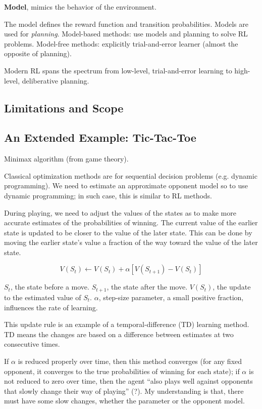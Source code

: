 \documentclass[lang=en,mode=geye,device=normal,color=blue,14pt]{elegantnote}
\DeclareMathOperator*{\1}{\mathbbm{1}}
\begin{document}
\begin{definition}
\textbf{Model}, mimics the behavior of the environment.
\end{definition}

The model defines the reward function and transition probabilities. Models are used for \textit{planning}.
Model-based methods: use models and planning to solve RL problems.
Model-free methods: explicitly trial-and-error learner (almost the opposite of planning).

Modern RL spans the spectrum from low-level, trial-and-error learning to high-level, deliberative planning.

\subsection{Limitations and Scope}
\subsection{An Extended Example: Tic-Tac-Toe}
Minimax algorithm \cite{wiki_minimax} (from game theory).

Classical optimization methods are for sequential decision problems (e.g. dynamic programming). We need to estimate an approximate opponent model so to use dynamic programming; in such case, this is similar to RL methods.

During playing, we need to adjust the values of the states as to make more accurate estimates of the probabilities of winning. The current value of the earlier state is updated to be closer to the value of the later state. This can be done by moving the earlier state's value a fraction of the way toward the value of the later state.

\begin{equation}
V(S_t) \leftarrow V(S_t) + \alpha[V(S_{t+1}) - V(S_t)]
\end{equation}

$S_t$, the state before a move.
$S_{t+1}$, the state after the move.
$V(S_t)$, the update to the estimated value of $S_t$.
$\alpha$, step-size parameter, a small positive fraction, influences the rate of learning.

This update rule is an example of a temporal-difference (TD) learning method. TD means the changes are based on a difference between estimates at two consecutive times.

If $\alpha$ is reduced properly over time, then this method converges (for any fixed opponent, it converges to the true probabilities of winning for each state); if $\alpha$ is not reduced to zero over time, then the agent ``also plays well against opponents that slowly change their way of playing'' (?). My understanding is that, there must have some slow changes, whether the parameter or the opponent model.
\end{document}
